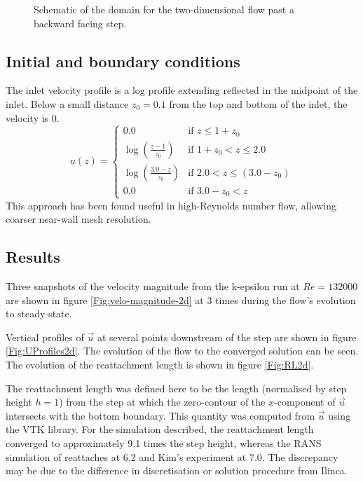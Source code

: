 \begin{figure}
\centering
{}
\caption{Schematic of the domain for the two-dimensional flow past a backward facing step.}
\label{Fig:Schematic2d}
\end{figure}

\subsection{Initial and boundary conditions}
The inlet velocity profile is a log profile extending reflected in the midpoint of the inlet. Below a small distance $z_0=0.1$ from the top and bottom of the inlet, the velocity is 0.
\begin{equation*}
u(z) =
  \begin{cases}
    0.0 & \text{if } z \leq 1+z_0 \\
    \log \left(\frac{z-1}{z_0}\right) & \text{if } 1+z_0 < z \leq 2.0 \\
    \log \left(\frac{3.0-z}{z_0}\right) & \text{if } 2.0 < z \leq (3.0-z_0) \\
    0.0 & \text{if } 3.0-z_0 < z
  \end{cases}
\end{equation*}
This approach has been found useful in high-Reynolds number flow, allowing coarser near-wall mesh resolution.

\subsection{Results}
Three snapshots of the velocity magnitude from the k-epsilon run at $Re=132000$
are shown in figure \ref{Fig:velo-magnitude-2d} at 3 times during the flow's evolution to steady-state.

Vertical profiles of $\vec{u}$ at several points downstream of the step are shown
in figure \ref{Fig:UProfiles2d}. The evolution of the flow to the converged solution can be seen.
The evolution of the reattachment length is shown in figure \ref{Fig:RL2d}.

The reattachment length was defined here to be the length (normalised by step height $h=1$)
from the step at which the zero-contour of the $x$-component of $\vec{u}$ intersects with
the bottom boundary. This quantity was computed from $\vec{u}$
using the VTK library. For the simulation described, the reattachment
length converged to approximately 9.1 times the step height,
whereas the RANS simulation of \cite{ilinca_97} reattaches at 6.2 and Kim's experiment at 7.0.
The discrepancy may be due to the difference in discretisation or solution procedure from Ilinca.

